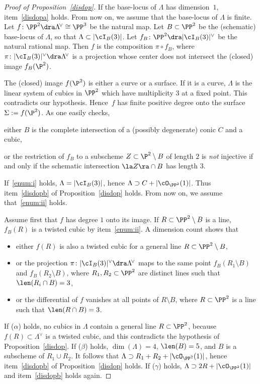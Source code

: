 \begin{proof}[Proof of Proposition~\ref{disdop}]
If the base-locus of $\Lambda$ has dimension~$1$, item~\eqref{disdopa} holds. From now on, we assume that the base-locus of $\Lambda$ is finite.
Let $f\colon\PP^2\dra \Lambda^{\!\vee}\cong\PP^3$ be the natural map. Let $ B\subset\PP^2$ be the (schematic) base-locus of $\Lambda$, so that $\Lambda\subset|\cI_{B}(3)|$. Let $f_{B}\colon\PP^2\dra |\cI_{B}(3)|^{\vee}$ be the natural rational map. Then $f$ is the composition $\pi\circ f_{B}$, where $\pi\colon |\cI_{B}(3)|^{\vee}\dra \Lambda^{\!\vee}$ is a projection whose center does not intersect the (closed) image $f_{B}(\P^2)$.

The (closed) image $f(\P^2)$ is either a curve or a surface.
If it is a curve, $\Lambda$ is the linear system of cubics in $\PP^2$ which have multiplicity $3$ at a fixed point. This contradicts our hypothesis.
Hence~$f$ has finite positive degree onto the surface
$\Sigma:=f(\P^2)$.
As one easily checks,
\begin{enumeratei}
\item\label{enum:i}
either ${B}$ is the complete intersection of a (possibly degenerate) conic $C$ and a cubic,
\item\label{enum:ii}
or the restriction of $f_{B}$ to a subscheme $Z\subset \P^2\setminus B$ of length $2$ is \emph{not} injective
if and only if the schematic intersection $\la Z\ra \cap{B}$ has length $3$.
\end{enumeratei}
If~\eqref{enum:i} holds, $\Lambda=|\cI_{B}(3)|$, hence $\Lambda\supset C+|\cO_{\PP^2}(1)|$. Thus item~\eqref{disdopb} of Proposition~\ref{disdop} holds. From now on, we assume that~\eqref{enum:ii} holds.

Assume first that $f$ has degree $1$ onto its image. If $R\subset\PP^2\setminus {B}$ is a line, $f_{B}(R)$ is a twisted cubic by item~\eqref{enum:ii}. A dimension count shows that
\begin{itemize}
\item[($\alpha$)]
either $f(R)$ is also a twisted cubic for a general line $R\subset \PP^2\setminus {B}$,
\item[($\beta$)]
or
the projection $\pi\colon |\cI_{B}(3)|^{\vee}\dra \Lambda^{\!\vee}$ maps to the same point $f_{B}(R_1\setminus{B})$ and $f_{B}(R_2\setminus{B})$, where $R_1,R_2\subset\PP^2$ are distinct lines such that $\len(R_i\cap{B})=3$,
\item[($\gamma$)]
or
the differential of $f$ vanishes at all points of $R\setminus{B}$, where $R\subset\PP^2$ is a line such that $\len(R\cap{B})=3$.
\end{itemize}
If ($\alpha$) holds, no cubics in $\Lambda$ contain a general line $R\subset\PP^2$, because $f(R)\subset\Lambda^{\!\vee}$ is a twisted cubic, and this contradicts the hypothesis of Proposition~\ref{disdop}. If ($\beta$) holds, $\dim(\Lambda)=4$, $\len({B})=5$, and ${B}$ is a subscheme of $R_1\cup R_2$. It follows that $\Lambda\supset R_1+R_2+|\cO_{\PP^2}(1)|$, hence
item~\eqref{disdopb} of Proposition~\ref{disdop} holds. If ($\gamma$) holds, $\Lambda\supset 2R+|\cO_{\PP^2}(1)|$ and item~\eqref{disdopb} holds again.


\end{proof}
